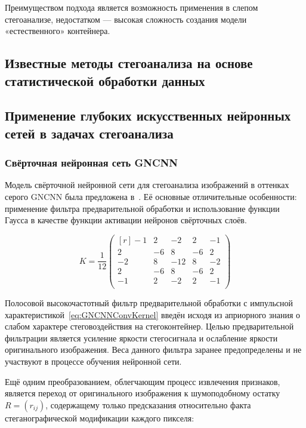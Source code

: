 Преимуществом подхода является возможность применения в слепом стегоанализе, недостатком — высокая сложность создания модели «естественного» контейнера.

\subsection{Известные методы стегоанализа на основе статистической обработки данных}
\subsection{Применение глубоких искусственных нейронных сетей в задачах стегоанализа}
\subsubsection{Свёрточная нейронная сеть GNCNN}

Модель свёрточной нейронной сети для стегоанализа изображений в оттенках серого GNCNN была предложена в~\cite{GNCNN}. Её основные отличительные особенности: применение фильтра предварительной обработки и использование функции Гаусса в качестве функции активации нейронов свёрточных слоёв.

\begin{equation}
\label{eq:GNCNNConvKernel}
K = \frac{1}{12}
\begin{pmatrix*}[r]
    -1 &  2 &    -2 &  2 & -1 \\
     2 & -6 &     8 & -6 &  2 \\
    -2 &  8 & -12 &  8 & -2 \\
     2 & -6 &     8 & -6 &  2 \\
    -1 &  2 &    -2 &  2 & -1 \\
\end{pmatrix*}
\end{equation}

Полосовой высокочастотный фильтр предварительной обработки с импульсной характеристикой~\eqref{eq:GNCNNConvKernel} введён исходя из априорного знания о слабом характере стеговоздействия на стегоконтейнер. Целью предварительной фильтрации является усиление яркости стегосигнала и ослабление яркости оригинального изображения. Веса данного фильтра заранее предопределены и не участвуют в процессе обучения нейронной сети.

Ещё одним преобразованием, облегчающим процесс извлечения признаков, является переход от оригинального изображения к шумоподобному остатку $ R = (r_{ij}) $, содержащему только предсказания относительно факта стеганографической модификации каждого пикселя:

